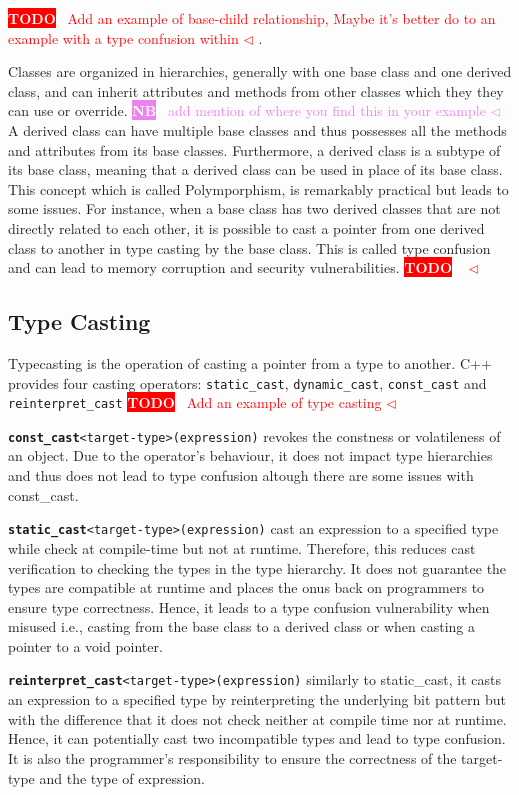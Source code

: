 \documentclass[a4paper,11pt,oneside]{report}
\newcommand{\todobox}[3]{%
       \colorbox{#1}{\textcolor{white}{\sffamily\bfseries\scriptsize #2}}%
       ~\textcolor{#1}{#3} %
       \textcolor{#1}{$\triangleleft$}%
}
\newcommand{\nb}[1]{\todobox{violet}{NB}{#1}}
\newcommand{\adrbqt}[1]{\todobox{red}{TODO}{#1}}
\begin{document}
\adrbqt{Add an example of base-child relationship, Maybe it's better do to an example with a type confusion within}.

Classes are organized in hierarchies, generally with one base class and one derived class, and can inherit attributes and methods from other classes which they
they can use or override. \nb{add mention of where you find this in your example}A derived class can have multiple base classes and thus possesses all the methods and attributes from its base classes. 
Furthermore, a derived class is a subtype of its base class, meaning that a derived class can be used in place of its base class. This concept which is called 
Polymporphism, is remarkably practical but leads to some issues. For instance, when a base class has two derived classes that are not directly related to each other, 
it is possible to cast a pointer from one derived class to another in type casting by the base class.
This is called type confusion and can lead to memory corruption and security vulnerabilities.
\adrbqt{}
\subsection{Type Casting}
Typecasting is the operation of casting a pointer from a type to another. C++ provides four casting operators: \texttt{static\_cast}, \texttt{dynamic\_cast}, 
\texttt{const\_cast} and \texttt{reinterpret\_cast}
\adrbqt{Add an example of type casting}

\texttt{\textbf{const\_cast}<target-type>(expression)} revokes the constness or volatileness of an object. Due to the operator's behaviour, it does not impact type hierarchies and 
thus does not lead to type confusion altough there are some issues with const\_cast.

\texttt{\textbf{static\_cast}<target-type>(expression)} cast an expression to a specified type while check at compile-time but not at runtime. Therefore, this reduces cast verification to checking the types 
in the type hierarchy. It does not guarantee the types are compatible at runtime and places the onus back on programmers to ensure type correctness. Hence, it leads to a type confusion vulnerability when misused i.e.,
casting from the base class to a derived class or when casting a pointer to a void pointer.

\texttt{\textbf{reinterpret\_cast}<target-type>(expression)} similarly to static\_cast, it casts an expression to a specified type by reinterpreting the underlying bit pattern but with the difference 
that it does not check neither at compile time nor at runtime. Hence, it can potentially cast two incompatible types and lead to type confusion. 
It is also the programmer's responsibility to ensure the correctness of the target-type and the type of expression.
\end{document}
